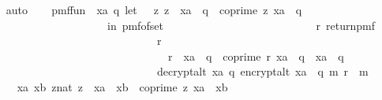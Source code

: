 \begin{isabellebody}
\ \ \isamarkupfalse%
\ auto\isanewline
\isanewline
\ \ \isamarkupfalse%
\ {\isacharquery}{\kern0pt}pmf{\isacharunderscore}{\kern0pt}fun{\isacharprime}{\kern0pt}{\isacharprime}{\kern0pt}{\isacharprime}{\kern0pt}\ {\isacharequal}{\kern0pt}\ {\isachardoublequoteopen}{\isasymlambda}xa{\isachardot}{\kern0pt}\ {\isasymlambda}q{\isachardot}{\kern0pt}\ {\isacharparenleft}{\kern0pt}let\ {\isasymZ}\ {\isacharequal}{\kern0pt}\ {\isacharbraceleft}{\kern0pt}z{\isachardot}{\kern0pt}\ z\ {\isacharless}{\kern0pt}\ xa\ {\isacharasterisk}{\kern0pt}\ q\ {\isasymand}\ coprime\ z\ {\isacharparenleft}{\kern0pt}xa\ {\isacharasterisk}{\kern0pt}\ q{\isacharparenright}{\kern0pt}{\isacharbraceright}{\kern0pt}\isanewline
\ \ \ \ \ \ \ \ \ \ \ \ \ \ \ \ \ \ \ \ \ \ in\ pmf{\isacharunderscore}{\kern0pt}of{\isacharunderscore}{\kern0pt}set\ {\isasymZ}\ {\isasymbind}\isanewline
\ \ \ \ \ \ \ \ \ \ \ \ \ \ \ \ \ \ \ \ \ \ \ \ \ {\isacharparenleft}{\kern0pt}{\isasymlambda}r{\isachardot}{\kern0pt}\ return{\isacharunderscore}{\kern0pt}pmf\isanewline
\ \ \ \ \ \ \ \ \ \ \ \ \ \ \ \ \ \ \ \ \ \ \ \ \ \ \ \ \ \ \ {\isacharparenleft}{\kern0pt}{\isacharparenleft}{\kern0pt}r\ {\isasymin}\ {\isasymZ}\ {\isasymor}\isanewline
\ \ \ \ \ \ \ \ \ \ \ \ \ \ \ \ \ \ \ \ \ \ \ \ \ \ \ \ \ \ \ \ \ r\ {\isacharless}{\kern0pt}\ xa\ {\isacharasterisk}{\kern0pt}\ q\ {\isasymand}\ coprime\ r\ {\isacharparenleft}{\kern0pt}xa\ {\isacharasterisk}{\kern0pt}\ q{\isacharparenright}{\kern0pt}\ {\isasymand}\ xa\ {\isasymnoteq}\ q{\isacharparenright}{\kern0pt}\ {\isasymor}\isanewline
\ \ \ \ \ \ \ \ \ \ \ \ \ \ \ \ \ \ \ \ \ \ \ \ \ \ \ \ \ \ \ decrypt{\isacharunderscore}{\kern0pt}alt\ xa\ q\ {\isacharparenleft}{\kern0pt}encrypt{\isacharunderscore}{\kern0pt}alt\ {\isacharparenleft}{\kern0pt}xa\ {\isacharasterisk}{\kern0pt}\ q{\isacharparenright}{\kern0pt}\ m\ r{\isacharparenright}{\kern0pt}\ {\isacharequal}{\kern0pt}\ m{\isacharparenright}{\kern0pt}{\isacharparenright}{\kern0pt}{\isacharparenright}{\kern0pt}{\isachardoublequoteclose}\isanewline
\ \ \isanewline
\ \ \isamarkupfalse%
\ {\isacharquery}{\kern0pt}{\isasymZ}\ {\isacharequal}{\kern0pt}\ {\isachardoublequoteopen}{\isasymlambda}xa\ xb{\isachardot}{\kern0pt}\ {\isacharbraceleft}{\kern0pt}{\isacharparenleft}{\kern0pt}z{\isacharcolon}{\kern0pt}{\isacharcolon}{\kern0pt}nat{\isacharparenright}{\kern0pt}{\isachardot}{\kern0pt}\ z\ {\isacharless}{\kern0pt}\ xa\ {\isacharasterisk}{\kern0pt}\ xb\ {\isasymand}\ coprime\ z\ {\isacharparenleft}{\kern0pt}xa\ {\isacharasterisk}{\kern0pt}\ xb{\isacharparenright}{\kern0pt}{\isacharbraceright}{\kern0pt}{\isachardoublequoteclose}\isanewline

\end{isabellebody}

